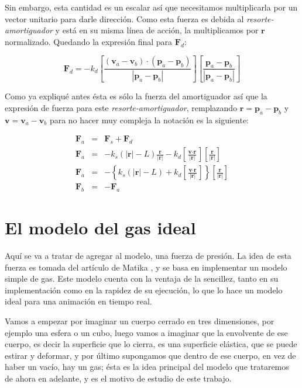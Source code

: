 Sin embargo, esta cantidad es un escalar así que necesitamos multiplicarla por un vector unitario para darle dirección.
Como esta fuerza es debida al \emph{resorte-amortiguador} y está en su misma línea de acción, la multiplicamos por $\textbf{r}$ normalizado.
Quedando la expresión final para $\textbf{F}_d$:

\begin{equation}
\textbf{F}_d = - k_d \left[ \frac{ ( \textbf{v}_a - \textbf{v}_b ) \cdot ( \textbf{p}_a - \textbf{p}_b ) } { | \textbf{p}_a - \textbf{p}_b |} \right] \left[ \frac{ \textbf{p}_a - \textbf{p}_b } { | \textbf{p}_a - \textbf{p}_b |} \right]
\end{equation}

Como ya expliqué antes ésta es sólo la fuerza del amortiguador así que la expresión de fuerza para este \emph{resorte-amortiguador}, remplazando $\textbf{r} = \textbf{p}_a - \textbf{p}_b$ y $\textbf{v} = \textbf{v}_a - \textbf{v}_b$ para no hacer muy compleja la notación es la siguiente:

\begin{eqnarray}
\textbf{F}_a & = & \textbf{F}_s + \textbf{F}_d \nonumber \\
\textbf{F}_a & = & -k_s \left( |\textbf{r}| - L \right) \frac{\textbf{r}}{|\textbf{r}|} - k_d \left[ \frac{ \textbf{v} \cdot \textbf{r} }{ |\textbf{r}|} \right] \left[ \frac{\textbf{r}} {|\textbf{r}|}\right] \nonumber \\
\label{fuerzaResorte}
\textbf{F}_a & = & - \left\{ k_s \left( |\textbf{r}| - L \right) + k_d \left[ \frac{ \textbf{v} \cdot \textbf{r} }{ |\textbf{r}|} \right] \right\} \left[ \frac{\textbf{r}} {|\textbf{r}|} \right] \\
\textbf{F}_b & = & -\textbf{F}_a \nonumber
\end{eqnarray}

\section{El modelo del gas ideal}

Aquí se va a tratar de agregar al modelo, una fuerza de presión.
La idea de esta fuerza es tomada del artículo de Matika \cite{Matyka:Presion}, y se basa en implementar un modelo simple de gas.
Este modelo cuenta con la ventaja de la sencillez, tanto en su implementación como en la rapidez de su ejecución, lo que lo hace un modelo ideal para una animación en tiempo real.

Vamos a empezar por imaginar un cuerpo cerrado en tres dimensiones, por ejemplo una esfera o un cubo, luego vamos a imaginar que la envolvente de ese cuerpo, es decir la superficie que lo cierra, es una superficie elástica, que se puede estirar y deformar, y por último supongamos que dentro de ese cuerpo, en vez de haber un vacío, hay un gas; ésta es la idea principal del modelo que trataremos de ahora en adelante, y es el motivo de estudio de este trabajo.

